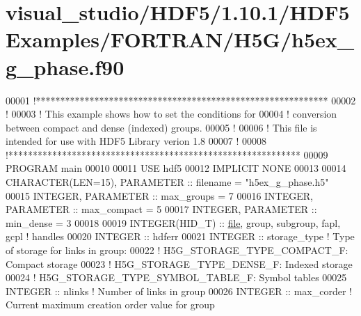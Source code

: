 \hypertarget{visual__studio_2_h_d_f5_21_810_81_2_h_d_f5_examples_2_f_o_r_t_r_a_n_2_h5_g_2h5ex__g__phase_8f90_source}{}\section{visual\+\_\+studio/\+H\+D\+F5/1.10.1/\+H\+D\+F5\+Examples/\+F\+O\+R\+T\+R\+A\+N/\+H5\+G/h5ex\+\_\+g\+\_\+phase.f90}
\label{visual__studio_2_h_d_f5_21_810_81_2_h_d_f5_examples_2_f_o_r_t_r_a_n_2_h5_g_2h5ex__g__phase_8f90_source}

\begin{DoxyCode}
00001 \textcolor{comment}{!************************************************************}
00002 \textcolor{comment}{!}
00003 \textcolor{comment}{!  This example shows how to set the conditions for}
00004 \textcolor{comment}{!  conversion between compact and dense (indexed) groups.}
00005 \textcolor{comment}{!}
00006 \textcolor{comment}{!  This file is intended for use with HDF5 Library verion 1.8}
00007 \textcolor{comment}{!}
00008 \textcolor{comment}{!************************************************************}
00009 \textcolor{keyword}{PROGRAM} main
00010 
00011   \textcolor{keywordtype}{USE }hdf5
00012   \textcolor{keywordtype}{IMPLICIT NONE}
00013 
00014   \textcolor{keywordtype}{CHARACTER(LEN=15)}, \textcolor{keywordtype}{PARAMETER} :: filename  = \textcolor{stringliteral}{"h5ex\_g\_phase.h5"}
00015   \textcolor{keywordtype}{INTEGER}, \textcolor{keywordtype}{PARAMETER} :: max\_groups  = 7
00016   \textcolor{keywordtype}{INTEGER}, \textcolor{keywordtype}{PARAMETER} :: max\_compact = 5
00017   \textcolor{keywordtype}{INTEGER}, \textcolor{keywordtype}{PARAMETER} :: min\_dense   = 3
00018 
00019   \textcolor{keywordtype}{INTEGER(HID\_T)}   :: \hyperlink{structfile}{file}, group, subgroup, fapl, gcpl \textcolor{comment}{! handles}
00020   \textcolor{keywordtype}{INTEGER} :: hdferr
00021   \textcolor{keywordtype}{INTEGER} :: storage\_type \textcolor{comment}{! Type of storage for links in group:}
00022                           \textcolor{comment}{!   H5G\_STORAGE\_TYPE\_COMPACT\_F: Compact storage}
00023                           \textcolor{comment}{!   H5G\_STORAGE\_TYPE\_DENSE\_F: Indexed storage}
00024                           \textcolor{comment}{!   H5G\_STORAGE\_TYPE\_SYMBOL\_TABLE\_F: Symbol tables}
00025   \textcolor{keywordtype}{INTEGER} :: nlinks       \textcolor{comment}{! Number of links in group}
00026   \textcolor{keywordtype}{INTEGER} :: max\_corder   \textcolor{comment}{! Current maximum creation order value for group}

\end{DoxyCode}
